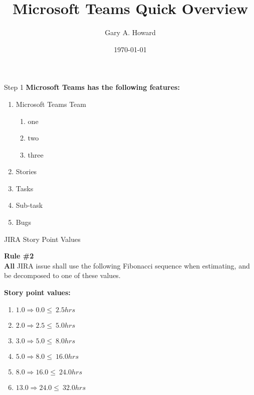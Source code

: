 \documentclass[compress, 10pt]{beamer}
\title{Microsoft Teams Quick Overview}
\date{\today}
\author{Gary A. Howard}
\begin{document}

\begin{frame}
\titlepage%
\end{frame}


\begin{frame}{Step 1}%
  \textbf{Microsoft Teams has the following features:}%
  \begin{enumerate}%
    \item Microsoft Teams Team%
      \begin{enumerate}%
        \item one
        \item two
        \item three
      \end{enumerate}%
    \item Stories%
    \item Tasks%
    \item Sub-task%
    \item Bugs%
  \end{enumerate}%
\end{frame}%


\begin{frame}{JIRA Story Point Values}%
  \begin{mdframed}[style=HavasuLightBlueStyle]%
    \textbf{Rule \#2}\\%
    \textbf{All} JIRA issue shall use the following Fibonacci sequence when
    estimating, and be decomposed to one of these values.
  \end{mdframed}%
  \begin{mdframed}[style=HavasuLightGreenStyle]%
    \textbf{Story point values:}%
    \begin{enumerate}%
      \item  $1.0 \Rightarrow  0.0 \leq\  2.5 hrs$%
      \item  $2.0 \Rightarrow  2.5 \leq\  5.0 hrs$%
      \item  $3.0 \Rightarrow  5.0 \leq\  8.0 hrs$%
      \item  $5.0 \Rightarrow  8.0 \leq\ 16.0 hrs$%
      \item  $8.0 \Rightarrow 16.0 \leq\ 24.0 hrs$%
      \item $13.0 \Rightarrow 24.0 \leq\ 32.0 hrs$%
    \end{enumerate}%
  \end{mdframed}%
\end{frame}%
\end{document}

